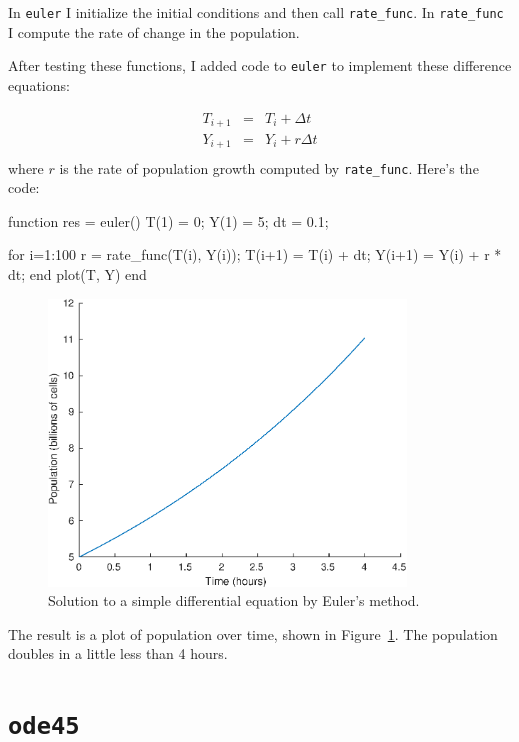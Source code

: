 \documentclass[
]{book}
\numberwithin{Answer}{chapter}
\numberwithin{Exercise}{chapter}
\begin{document}
In {\tt euler} I initialize the initial conditions and then call \verb"rate_func".  In \verb"rate_func" I compute the rate of change in the population.

After testing these functions, I added code to {\tt euler} to implement these difference equations:

\begin{eqnarray}
T_{i+1} &=& T_i + \Delta t                 \\
Y_{i+1} &=& Y_i + r \Delta t           \\
\end{eqnarray}
%
where $r$ is the rate of population growth computed by \verb"rate_func".
Here's the code:

\begin{code}
function res = euler()
    T(1) = 0;
    Y(1) = 5;
    dt = 0.1;
    
    for i=1:100
        r = rate_func(T(i), Y(i));
        T(i+1) = T(i) + dt;
        Y(i+1) = Y(i) + r * dt;
    end
    plot(T, Y)
end
\end{code}

\begin{figure}
\centerline{\includegraphics[height=3in]{figs/euler.eps}}
\caption{Solution to a simple differential equation by Euler's method.}
\label{fig:euler}
\end{figure}

The result is a plot of population over time, shown in Figure~\ref{fig:euler}.  The population doubles in a little less than 4 hours.


\section{{\tt ode45}}
\label{sect:ode45}
\end{document}
